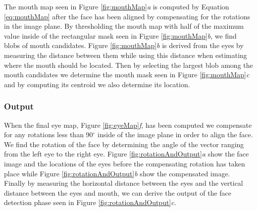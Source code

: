 The mouth map seen in Figure \ref{fig:mouthMap}\textit{a} is computed by 
Equation \ref{eq:mouthMap} after the face has been aligned by compensating for the rotations in the image plane. By thresholding the mouth map with half of the maximum value inside of the rectangular mask seen in Figure \ref{fig:mouthMap}\textit{b}, we find blobs of mouth candidates. Figure \ref{fig:mouthMap}\textit{b} is derived from the eyes by measuring the distance between them while using this distance when estimating where the mouth should be located. Then by selecting the largest blob among the mouth candidates we determine the mouth mask seen in Figure \ref{fig:mouthMap}\textit{c} and by computing its centroid we also determine its location. 







\subsubsection{Output}

When the final eye map, Figure \ref{fig:eyeMap}\textit{f}, has been computed we compensate for any rotations less than 90$^{\circ}$ inside of the image plane in order to align the face. We find the rotation of the face by determining the angle of the vector ranging from the left eye to the right eye. Figure \ref{fig:rotationAndOutput}\textit{a} show the face image and the locations of the eyes before the compensating rotation has taken place while Figure \ref{fig:rotationAndOutput}\textit{b} show the compensated image. Finally by measuring the horizontal distance between the eyes and the vertical distance between the eyes and mouth, we can derive the output of the face detection phase seen in Figure \ref{fig:rotationAndOutput}\textit{c}.

